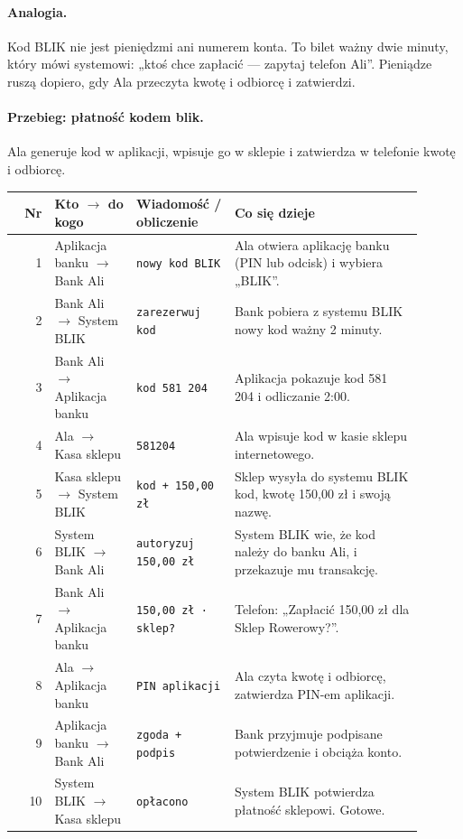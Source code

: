 \paragraph{Analogia.} Kod BLIK nie jest pieniędzmi ani numerem konta. To bilet ważny dwie minuty, który mówi systemowi: „ktoś chce zapłacić — zapytaj telefon Ali”. Pieniądze ruszą dopiero, gdy Ala przeczyta kwotę i odbiorcę i zatwierdzi.

\paragraph{Przebieg: płatność kodem blik.} Ala generuje kod w aplikacji, wpisuje go w sklepie i zatwierdza w telefonie kwotę i odbiorcę.
\begingroup\footnotesize
\begin{longtable}{@{}r p{0.2\linewidth} p{0.24\linewidth} p{0.46\linewidth}@{}}
\toprule
Nr & Kto $\rightarrow$ do kogo & Wiadomość / obliczenie & Co się dzieje \\
\midrule
\endhead
1 & Aplikacja banku $\rightarrow$ Bank Ali & \texttt{nowy kod BLIK} & Ala otwiera aplikację banku (PIN lub odcisk) i wybiera „BLIK”. \\
2 & Bank Ali $\rightarrow$ System BLIK & \texttt{zarezerwuj kod} & Bank pobiera z systemu BLIK nowy kod ważny 2 minuty. \\
3 & Bank Ali $\rightarrow$ Aplikacja banku & \texttt{kod 581 204} & Aplikacja pokazuje kod 581 204 i odliczanie 2:00. \\
4 & Ala $\rightarrow$ Kasa sklepu & \texttt{581204} & Ala wpisuje kod w kasie sklepu internetowego. \\
5 & Kasa sklepu $\rightarrow$ System BLIK & \texttt{kod + 150,00 zł} & Sklep wysyła do systemu BLIK kod, kwotę 150,00 zł i swoją nazwę. \\
6 & System BLIK $\rightarrow$ Bank Ali & \texttt{autoryzuj 150,00 zł} & System BLIK wie, że kod należy do banku Ali, i przekazuje mu transakcję. \\
7 & Bank Ali $\rightarrow$ Aplikacja banku & \texttt{150,00 zł · sklep?} & Telefon: „Zapłacić 150,00 zł dla Sklep Rowerowy?”. \\
8 & Ala $\rightarrow$ Aplikacja banku & \texttt{PIN aplikacji} & Ala czyta kwotę i odbiorcę, zatwierdza PIN-em aplikacji. \\
9 & Aplikacja banku $\rightarrow$ Bank Ali & \texttt{zgoda + podpis} & Bank przyjmuje podpisane potwierdzenie i obciąża konto. \\
10 & System BLIK $\rightarrow$ Kasa sklepu & \texttt{opłacono} & System BLIK potwierdza płatność sklepowi. Gotowe. \\
\bottomrule
\end{longtable}
\endgroup

